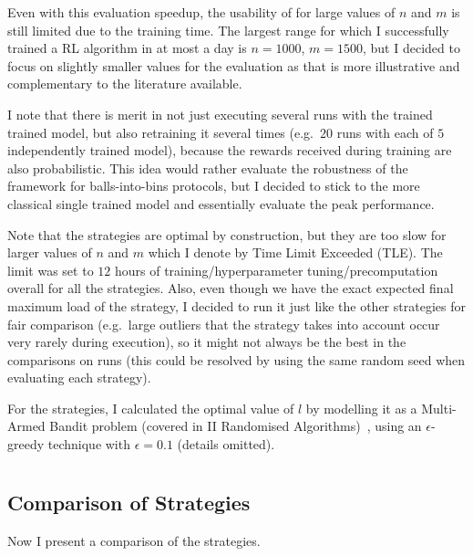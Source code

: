 Even with this evaluation speedup, the usability of \DQL for large values of $n$ and $m$ is still limited due to the training time. The largest range for which I successfully trained a RL algorithm in at most a day is $n=1000$, $m=1500$, but I decided to focus on slightly smaller values for the evaluation as that is more illustrative and complementary to the literature available.  


I note that there is merit in not just executing several runs with the trained trained \DQL model, but also retraining it several times (e.g.\ $20$ runs with each of $5$ independently trained model), because the rewards received during training are also probabilistic. This idea would rather evaluate the robustness of the \DQL framework for balls-into-bins protocols, but I decided to stick to the more classical single trained model and essentially evaluate the peak performance.


Note that the \DP strategies are optimal by construction, but they are too slow for larger values of $n$ and $m$ which I denote by Time Limit Exceeded (TLE). The limit was set to $12$ hours of training/hyperparameter tuning/precomputation overall for all the strategies. Also, even though we have the exact expected final maximum load of the \DP strategy, I decided to run it just like the other strategies for fair comparison (e.g.\ large outliers that the \DP strategy takes into account occur very rarely during execution), so it might not always be the best in the comparisons on \NumberofRuns runs (this could be resolved by using the same random seed when evaluating each strategy).


For the \Threshold strategies, I calculated the optimal value of $l$ by modelling it as a Multi-Armed Bandit problem (covered in II Randomised Algorithms)~\cite{katehakis1987multiarmedbandit}, using an $\epsilon$-greedy technique with $\epsilon=0.1$ (details omitted).




\section{\TwoThinning}


\subsection{Comparison of Strategies}\label{two-thinning-comparison}

Now I present a comparison of the \TwoThinning strategies.


